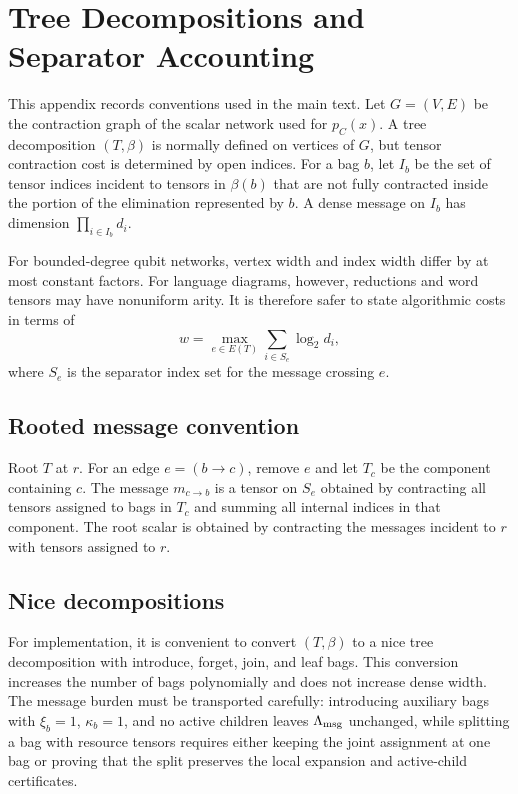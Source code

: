 \section{Tree Decompositions and Separator Accounting}
\label{app:tree}

This appendix records conventions used in the main text. Let \(G=(V,E)\) be the contraction graph of the scalar network used for \(p_C(x)\). A tree decomposition \((T,\beta)\) is normally defined on vertices of \(G\), but tensor contraction cost is determined by open indices. For a bag \(b\), let \(I_b\) be the set of tensor indices incident to tensors in \(\beta(b)\) that are not fully contracted inside the portion of the elimination represented by \(b\). A dense message on \(I_b\) has dimension \(\prod_{i\in I_b}d_i\).

For bounded-degree qubit networks, vertex width and index width differ by at most constant factors. For language diagrams, however, reductions and word tensors may have nonuniform arity. It is therefore safer to state algorithmic costs in terms of
\[
w=\max_{e\in E(T)}\sum_{i\in S_e}\log_2 d_i,
\]
where \(S_e\) is the separator index set for the message crossing \(e\).

\subsection{Rooted message convention}

Root \(T\) at \(r\). For an edge \(e=(b\to c)\), remove \(e\) and let \(T_c\) be the component containing \(c\). The message \(m_{c\to b}\) is a tensor on \(S_e\) obtained by contracting all tensors assigned to bags in \(T_c\) and summing all internal indices in that component. The root scalar is obtained by contracting the messages incident to \(r\) with tensors assigned to \(r\).

\subsection{Nice decompositions}

For implementation, it is convenient to convert \((T,\beta)\) to a nice tree decomposition with introduce, forget, join, and leaf bags. This conversion increases the number of bags polynomially and does not increase dense width. The message burden must be transported carefully: introducing auxiliary bags with \(\xi_b=1\), \(\kappa_b=1\), and no active children leaves \(\Lambda_{\mathrm{msg}}\) unchanged, while splitting a bag with resource tensors requires either keeping the joint assignment at one bag or proving that the split preserves the local expansion and active-child certificates.

